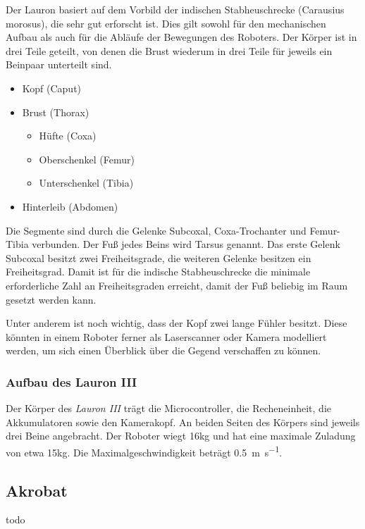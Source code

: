 Der Lauron basiert auf dem Vorbild der indischen Stabheuschrecke (Carausius morosus), die sehr gut erforscht ist. Dies gilt sowohl für den mechanischen Aufbau als auch für die Abläufe der Bewegungen des Roboters. Der Körper ist in drei Teile geteilt, von denen die Brust wiederum in drei Teile für jeweils ein Beinpaar unterteilt sind.
\begin{itemize}
  \item Kopf (Caput)
  \item Brust (Thorax)
  \begin{itemize}
  \item Hüfte (Coxa)
  \item Oberschenkel (Femur)
  \item Unterschenkel (Tibia)
  \end{itemize}
  \item Hinterleib (Abdomen)
\end{itemize}

Die Segmente sind durch die Gelenke Subcoxal, Coxa-Trochanter und Femur-Tibia verbunden. Der Fuß jedes Beins wird Tarsus genannt. Das erste Gelenk Subcoxal besitzt zwei Freiheitsgrade, die weiteren Gelenke besitzen ein Freiheitsgrad. Damit ist für die indische Stabheuschrecke die minimale erforderliche Zahl an Freiheitsgraden erreicht, damit der Fuß beliebig im Raum gesetzt werden kann.

Unter anderem ist noch wichtig, dass der Kopf zwei lange Fühler besitzt. Diese könnten in einem Roboter ferner  als Laserscanner oder Kamera modelliert werden, um sich einen Überblick über die Gegend verschaffen zu können. \autocite{gassmann2000} \autocite{troilo2007}

\subsubsection{Aufbau des Lauron III}

Der Körper des \emph{Lauron III} trägt die Microcontroller, die Recheneinheit, die Akkumulatoren sowie den Kamerakopf. An beiden Seiten des Körpers sind jeweils drei Beine angebracht. Der Roboter wiegt 16kg und hat eine maximale Zuladung von etwa 15kg. Die Maximalgeschwindigkeit beträgt \SI{0.5}{\metre\per\second}. \autocite{gassmann2000}

\subsection{Akrobat}

todo

